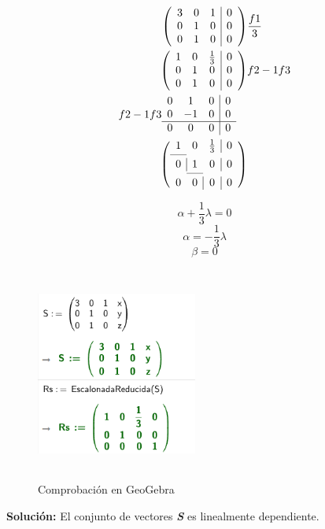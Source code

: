 \[
    \begin{aligned}
        \left(
            \begin{array}{ccc|c}
                3 & 0 & 1 & 0 \\
                0 & 1 & 0 & 0 \\
                0 & 1 & 0 & 0 \\
            \end{array}
        \right)
        &\frac{f1}{3} \\
        \left(
            \begin{array}{ccc|c}
                1 & 0 & \frac{1}{3} & 0 \\
                0 & 1 & 0 & 0 \\
                0 & 1 & 0 & 0 \\
            \end{array}
        \right)
        &f2-1f3 \\
        \begin{aligned}
            f2-1f3
            &\begin{array}{ccc|c}
                0 & 1 & 0 & 0 \\
                0 & -1 & 0 & 0  \\
                \hline
                0 & 0 & 0 & 0 \\ 
            \end{array}
        \end{aligned} \\
        \left(
            \begin{array}{ccc|c}
                1 & 0 & \frac{1}{3} & 0 \\
                \cmidrule{1-1} \multicolumn{1}{c|}{0} & 1 & 0 & 0 \\
                \cmidrule{2-2} 0 & \multicolumn{1}{c|}{0} & 0 & 0 \\
            \end{array}
        \right)
    \end{aligned}
\]

\[
    \alpha+\frac{1}{3}\lambda=0
\]
\[
    \alpha=-\frac{1}{3}\lambda
\]
\[
    \beta=0
\]
\begin{figure}[ht!]
    \centering
    \includegraphics[width=150pt,height=200pt]{img/imagen10.png}
    \caption{Comprobación en GeoGebra}
\end{figure}
\begin{center}
    \textbf{Solución: }El conjunto de vectores \textbf{\textit{S}} es linealmente dependiente.
\end{center}
